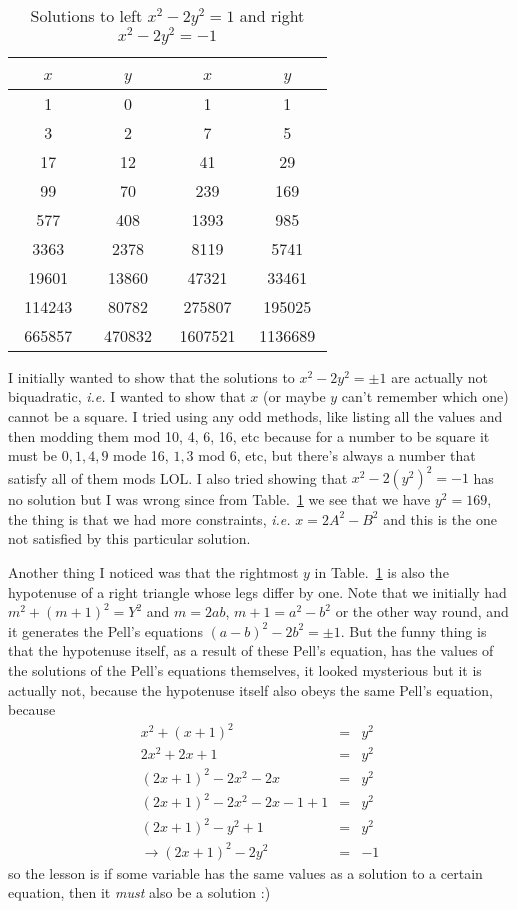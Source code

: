 \documentclass[aps,preprint,preprintnumbers,nofootinbib,showpacs,prd]{revtex4-1}
\newcommand{\ie}{{\it i.e.} }
\newcommand{\nbea}{\begin{eqnarray*}}
\newcommand{\neea}{\end{eqnarray*}}
\begin{document}
%
\begin{table}[]
\centering
\caption{Solutions to left $x^2 - 2y^2 = 1$ and right $x^2 - 2y^2 = -1$}
\label{Tab:1}
\begin{tabular}{|c|c|c|c|}
\hline
~~~$x$~~~ & ~~~$y$~~~ & ~~~$x$~~~ & ~~~$y$~~~  \\ \hline 
1 & 0 & 1 & 1 \\
3 & 2 & 7 & 5 \\
17 & 12 & 41 & 29 \\ 
99 & 70 & 239 & 169 \\
577 & 408 & 1393 & 985 \\
3363 & 2378 & 8119 & 5741 \\
19601 & 13860 & 47321 & 33461 \\
114243 & 80782 & 275807 & 195025 \\
665857 & 470832 & 1607521 & 1136689 \\
\hline
\end{tabular}
\end{table}
%

I initially wanted to show that the solutions to $x^2 - 2y^2 = \pm1$ are actually not biquadratic, \ie I wanted to show that $x$ (or maybe $y$ can't remember which one) cannot be a square. I tried using any odd methods, like listing all the values and then modding them mod 10, 4, 6, 16, etc because for a number to be square it must be $0,1,4,9$ mode 16, $1,3$ mod 6, etc, but there's always a number that satisfy all of them mods LOL. I also tried showing that $x^2 - 2(y^2)^2 = -1$ has no solution but I was wrong since from Table.~\ref{Tab:1} we see that we have $y^2 = 169$, the thing is that we had more constraints, \ie $x = 2A^2 - B^2$ and this is the one not satisfied by this particular solution.

Another thing I noticed was that the rightmost $y$ in Table.~\ref{Tab:1} is also the hypotenuse of a right triangle whose legs differ by one. Note that we initially had $m^2 + (m+1)^2 = Y^2$ and $m=2ab$, $m+1 = a^2 - b^2$ or the other way round, and it generates the Pell's equations $(a-b)^2 - 2b^2 = \pm1$. But the funny thing is that the hypotenuse itself, as a result of these Pell's equation, has the values of the solutions of the Pell's equations themselves, it looked mysterious but it is actually not, because the hypotenuse itself also obeys the same Pell's equation, because
%
\nbea
x^2 + (x+1)^2 & = & y^2 \\
2x^2 + 2x + 1 & = & y^2 \\
(2x + 1)^2 - 2x^2 - 2x & = & y^2 \\
(2x + 1)^2 - 2x^2 - 2x -1 + 1 & = & y^2 \\
(2x + 1)^2 - y^2 + 1 & = & y^2 \\
\to (2x + 1)^2 - 2y^2 & = & -1
\neea
%
so the lesson is if some variable has the same values as a solution to a certain equation, then it {\it must} also be a solution :)
\end{document}
